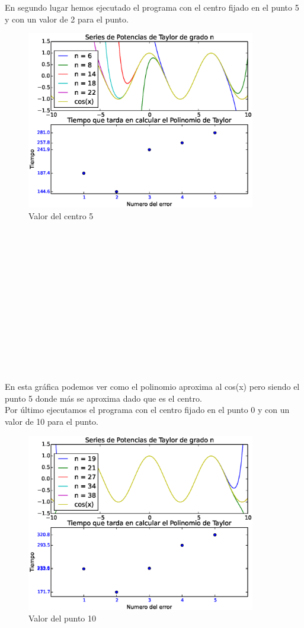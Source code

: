 En segundo lugar hemos ejecutado el programa con el centro fijado en el punto 5 y con un valor de 2 para el punto.
\begin{figure}[htb]
\begin{center}
\includegraphics[width=10cm]{images/Graficascentro5.eps}
\caption{Valor del centro 5}
\label{fig}
\end{center}
\end{figure}
\\ \\ \\ \\ \\ \\ \\ \\ \\ \\ \\ \\ \\
En esta gr\'afica podemos ver como el polinomio aproxima al cos(x) pero siendo el punto 5 donde m\'as se aproxima dado que es el centro.\\
Por \'ultimo ejecutamos el programa con el centro fijado en el punto 0 y con un valor de 10 para el punto.
\begin{figure}[htb]
\begin{center}
\includegraphics[width=10cm]{images/Graficas10.eps}
\caption{Valor del punto 10}
\label{fig}
\end{center}
\end{figure}